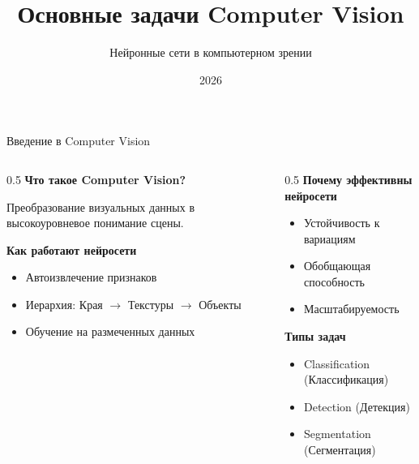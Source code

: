 \documentclass[aspectratio=169, 9pt]{beamer}
\title{Основные задачи Computer Vision}
\subtitle{Нейронные сети в компьютерном зрении}
\date{2026}
\begin{document}
\begin{frame}
\titlepage
\end{frame}

\begin{frame}{Введение в Computer Vision}
\begin{columns}[T]
\begin{column}{0.5\textwidth}
{\bfseries\textcolor{blue!70}{Что такое Computer Vision?}}

{\small Преобразование визуальных данных в высокоуровневое понимание сцены.}

\vspace{0.5em}
{\bfseries\textcolor{blue!70}{Как работают нейросети}}

{\small
\begin{itemize}
    \item Автоизвлечение признаков
    \item Иерархия: Края $\to$ Текстуры $\to$ Объекты
    \item Обучение на размеченных данных
\end{itemize}
}
\end{column}

\begin{column}{0.5\textwidth}
{\bfseries\textcolor{green!50!black}{Почему эффективны нейросети}}

{\small
\begin{itemize}
    \item Устойчивость к вариациям
    \item Обобщающая способность
    \item Масштабируемость
\end{itemize}
}

\vspace{0.5em}
{\bfseries\textcolor{blue!70}{Типы задач}}

{\small
\begin{itemize}
    \item Classification (Классификация)
    \item Detection (Детекция)
    \item Segmentation (Сегментация)
\end{itemize}
}
\end{column}
\end{columns}
\end{frame}
\end{document}
